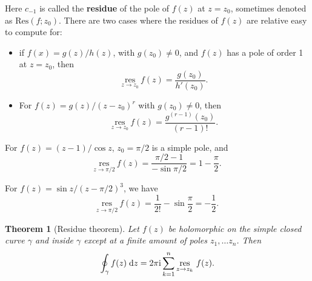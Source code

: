 \documentclass[letter-paper]{tufte-book}
\newtheorem{theorem}{\color{pastel-blue}Theorem}[section]
\newenvironment{example}[1][Example]{\begin{trivlist}
\item[\hskip \labelsep {\bfseries #1}]}{\end{trivlist}}
\newcommand{\zi}{{\rm i}}
\newcommand\Def[1]{\textbf{#1}}
\begin{document}
Here $c_{-1}$ is called the \Def{residue} of the pole of $f(z)$ at $z=z_0$,
sometimes denoted as $\mbox{Res}(f; z_0)$. There are two cases where the
residues of $f(z)$ are relative easy to compute for:

\begin{itemize}
  \item if $f(x) = g(z) / h(z)$, with $g(z_0) \neq 0$, and $f(z)$ has a pole of
  order 1 at $z = z_0$, then
  \begin{equation}
    \underset{z \to z_0}{\mbox{res}}\ f(z) = \frac{g(z_0)}{h'(z_0)}.
  \end{equation}
  
  \item For $f(z) = g(z) / (z - z_0)^r$ with $g(z_0) \neq 0$, then
  \begin{equation}
    \underset{z \to z_0}{\mbox{res}}\ f(z) = \frac{g^{(r-1)}(z_0)}{(r-1)!}.
  \end{equation}
\end{itemize}

\begin{example}
  For $f(z) = (z-1)/\cos z$, $z_0 = \pi/2$ is a simple pole, and
  \begin{equation*}
    \underset{z \to \pi/2}{\mbox{res}}\ f(z) = \frac{\pi/2 - 1}{-\sin\pi/2} = 1 - \frac{\pi}{2}.
  \end{equation*}
\end{example}

\begin{example}
  For $f(z) = \sin z/(z - \pi/2)^3$, we have
  \begin{equation*}
    \underset{z \to \pi/2}{\mbox{res}}\ f(z) = \frac{1}{2!}-\sin \frac{\pi}{2} = -\frac{1}{2}.
  \end{equation*}
\end{example}

\begin{theorem}[Residue theorem]
  Let $f(z)$ be holomorphic on the simple closed curve $\gamma$ and inside
  $\gamma$ except at a finite amount of poles $z_1, \ldots z_n$. Then
  \begin{equation}
    \oint_\gamma f(z)\; \mathrm{d}z = 2\pi \zi \sum^n_{k=1} \underset{z \to z_k}{\mbox{res}}\ f(z).
  \end{equation}
\end{theorem}
\end{document}
